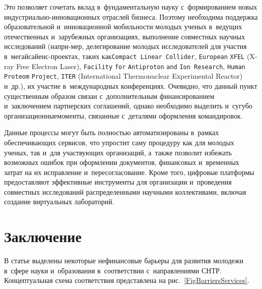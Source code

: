 \begin{multicols}{2}
Это позволяет сочетать вклад в~фундаментальную науку с~формированием 
новых ин\-ду\-ст\-ри\-аль\-но-ин\-но\-ва\-ци\-он\-ных отраслей бизнеса. 
Поэтому\linebreak
 необходима поддержка образовательной и~инновационной мобильности молодых 
ученых в~ведущих\linebreak
 отечественных и~зарубежных организациях, выполнение совместных 
научных исследований (напри-\linebreak мер, делегирование молодых исследователей для 
участия в~ме\-гай\-сай\-енс-про\-ек\-тах,
 таких как\linebreak \verb"Compact Linear Collider", 
\verb"European" \verb"XFEL" (X-ray Free Electron Laser), %
\verb"Facility" \verb"for" \verb"Antiproton" \verb"and" \verb"Ion Research", 
\verb"Human" \verb"Proteom" \verb"Project", \verb"ITER" (International Thermonuclear Experimental
Reactor) и~др.), их участие в~международных 
конференциях. Очевидно, что данный пункт существенным образом\linebreak
 связан с~дополнительным 
финансированием и~заключением партнерских соглашений, однако необходимо 
выделить и~сугубо организационные\linebreak моменты, связанные с~деталями оформления 
командировок. 

Данные процессы могут быть полностью автоматизированы в~рамках 
обеспечивающих сервисов, что упростит саму процедуру как для молодых ученых, 
так и~для участвующих организаций, а~также позволит избежать возможных ошибок 
при оформлении документов, финансовых и~временн$\acute{\mbox{ы}}$х 
затрат на их исправление и~пересогласование. Кроме того, циф\-ро\-вые платформы 
предоставляют эффективные инструменты для организации и~проведения совместных 
исследований распределенными научными коллективами, включая создание виртуальных 
лабораторий.

\section{Заключение}

В статье выделены некоторые нефинансовые барь\-е\-ры для развития молодежи в~сфере 
науки и~образования в~соответствии с~направлениями СНТР. Концептуальная схема 
соответствия представлена на рис.~\ref{FigBarriersServices}.



\end{multicols}
